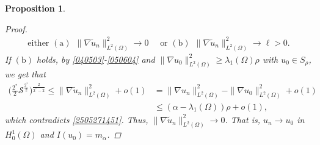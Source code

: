 \documentclass[10pt]{article}
\numberwithin{equation}{section}
\newtheorem{proposition}[theorem]{Proposition}
\numberwithin{equation}{section}
\begin{document}
\begin{proposition}
\begin{proof}
\begin{equation*}
\begin{aligned}
\text{either }\mathrm{(a)}~~\|\nabla \tilde{u}_n\|^{2}_{L^{2}(\Omega)}\rightarrow 0 \quad
\text{ or } \mathrm{(b)}~~\|\nabla \tilde{u}_n\|^{2}_{L^{2}(\Omega)}\rightarrow \ell>0.
\end{aligned}
\end{equation*}
If $\mathrm{(b)}$ holds,
by \eqref{040503}-\eqref{050604} and $\|\nabla u_0\|^{2}_{L^{2}(\Omega)}\geq\lambda_{1}(\Omega)\rho$ with $u_0\in S_{\rho}$, we get that
\begin{equation*}
\begin{aligned}
\Big(\frac{2^{*}}{2}\mathcal{S}^{\frac{2^{*}}{2}}\Big)^{\frac{2}{2^{*}-2}}
\leq\|\nabla \tilde{u}_n\|^{2}_{L^{2}(\Omega)}+o(1)
&=\|\nabla u_n\|^{2}_{L^{2}(\Omega)}
-\|\nabla u_0\|^{2}_{L^{2}(\Omega)}+o(1)\\
&\leq(\alpha-\lambda_{1}(\Omega))\rho+o(1),
\end{aligned}
\end{equation*}
which contradicts \eqref{2505271451}. Thus, $\|\nabla \tilde{u}_n\|^{2}_{L^{2}(\Omega)}\rightarrow 0$. That is, $u_n\rightarrow u_0$ in $H^1_0(\Omega)$ and $I(u_0)=m_{\alpha}$.
\end{proof}
\end{proposition}
\end{document}
